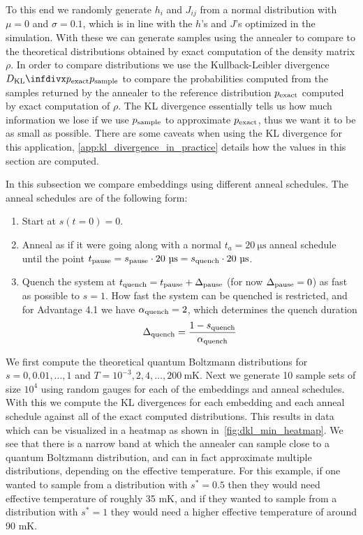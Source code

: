 To this end we randomly generate \( h_i \) and \( J_{ij} \) from a normal distribution with \( \mu = 0 \) and \( \sigma = 0.1 \), which is in line with the \( h \)'s and \( J \)'s optimized in the simulation.
With these we can generate samples using the annealer to compare to the theoretical distributions obtained by exact computation of the density matrix \( \rho \).
In order to compare distributions we use the Kullback-Leibler divergence \( \DKL{\pexact}{\psample} \) to compare the probabilities computed from the samples returned by the annealer to the reference distribution \( p_{\text{exact}} \) computed by exact computation of \( \rho \).
The KL divergence essentially tells us how much information we lose if we use \( p_{\text{sample}} \) to approximate \( p_{\text{exact}} \), thus we want it to be as small as possible.
There are some caveats when using the KL divergence for this application, \cref{app:kl_divergence_in_practice} details how the values in this section are computed.

In this subsection we compare embeddings using different anneal schedules.
The anneal schedules are of the following form:
\begin{enumerate}
    \item Start at \( s(t = 0) = 0 \).
    \item Anneal as if it were going along with a normal \( t_a = 20 \ \si{\micro\second} \) anneal schedule until the point \( \tpause = \spause \cdot 20 \ \si{\micro\second} = \squench \cdot 20 \ \si{\micro\second} \).
    \item Quench the system at \( t_{\text{quench}} = t_{\text{pause}} + \Delta_{\text{pause}} \) (for now \( \Delta_{\text{pause}} = 0 \)) as fast as possible to \( s = 1 \).
        How fast the system can be quenched is restricted, and for Advantage 4.1 we have \( \alpha_{\text{quench}} = 2 \), which determines the quench duration
        \[
            \Delta_{\text{quench}} = \frac{1 - s_{\text{quench}}}{\alpha_{\text{quench}}}
        \]
\end{enumerate}

We first compute the theoretical quantum Boltzmann distributions for \( s = 0, 0.01, \dots, 1 \) and \( T = 10^{-3}, 2, 4, \dots, 200 \ \si{\milli\kelvin} \).
Next we generate 10 sample sets of size \( 10^4 \) using random gauges for each of the embeddings and anneal schedules.
With this we compute the KL divergences for each embedding and each anneal schedule against all of the exact computed distributions.
This results in data which can be visualized in a heatmap as shown in~\cref{fig:dkl_min_heatmap}.
We see that there is a narrow band at which the annealer can sample close to a quantum Boltzmann distribution, and can in fact approximate multiple distributions, depending on the effective temperature.
For this example, if one wanted to sample from a distribution with \( s^* = 0.5 \) then they would need effective temperature of roughly 35 \si{\milli\kelvin}, and if they wanted to sample from a distribution with \( s^* = 1 \) they would need a higher effective temperature of around 90 \si{\milli\kelvin}.

